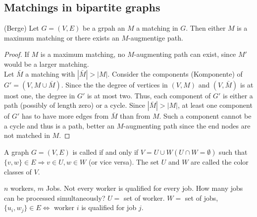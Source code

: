 \begin{lec}[2011-11-04]\end{lec}

\subsection*{Matchings in bipartite graphs}


\begin{thm}(Berge) Let $G=(V,E)$ be a grpah an $M$ a matching in $G$. Then either $M$ is a maximum matching or there exists an $M$-augmentige path.
\end{thm}
\begin{proof}
If $M$ is a maximum matching, no $M$-augmenting path can exist, since $M'$ would be a larger matching. \\
Let $\bar{M}$ a matching with $|\bar M | > | M |$. Consider the components (Komponente) of $G'=(V,M \cup \bar M)$. Since the the degree of vertices in $(V,M)$ and $(V,\bar M)$ is at most one, the degree in $G'$ is at most two. Thus, each component of $G'$ is either a path (possibly of length zero) or a cycle. Since $|\bar M| > |M|$, at least one component of $G'$ has to have more edges from $\bar M$ than from $M$. Such a component cannot be a cycle and thus is a path, better an $M$-augmenting path since the end nodes are not matched in $M$.
\end{proof}

\begin{defn} 
A graph $ G=(V,E) $ is called  if and only if $V=U \cup W (U\cap W =\emptyset)$ such that $\{v,w\} \in E \Rightarrow v \in U, w \in W$ (or vice versa). The set $U$ and $W$ are called the color classes of $V$.
\end{defn}

\begin{xmp+}
$n$ workers, $m$ Jobs. Not every worker is qualified for every job. How many jobs can be processed simultaneously? $U=$ set of worker. $W=$ set of jobs, $\{u_i,w_j\} \in E \Leftrightarrow$ worker $i$ is qualified for job $j$.
\end{xmp+}

